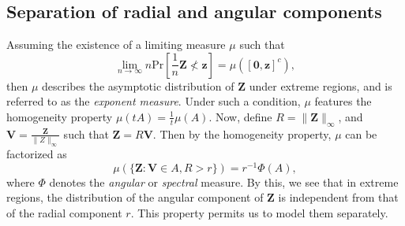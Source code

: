 \subsection{Separation of radial and angular components}
Assuming the existence of a limiting measure $\mu$ such that
\[
    \lim_{n\to\infty} n\text{Pr}\left[\frac{1}{n}\bm{Z} \not< \bm{z}\right] = \mu\left([\bm{0},\bm{z}]^c\right),
\]
then $\mu$ describes the asymptotic distribution of $\bm{Z}$ under extreme regions, and is 
    referred to as the \emph{exponent measure}.  Under such a condition, $\mu$ features 
    the homogeneity property $\mu(tA) = \frac{1}{t}\mu(A)$.  Now, define 
    $R = \lVert \bm{Z}\rVert_{\infty}$, and $\bm{V} = \frac{\bm{Z}}{\lVert Z\rVert_{\infty}}$
    such that $\bm{Z} = R\bm{V}$.  Then by the homogeneity property, $\mu$ can be factorized as
    \[
        \mu\left(\{\bm{Z} : \bm{V} \in A, R > r\}\right) = r^{-1}\Phi(A),    
    \]
    where $\Phi$ denotes the \emph{angular} or \emph{spectral} measure.  By this, we see 
    that in extreme regions, the distribution of the angular component of $\bm{Z}$ is 
    independent from that of the radial component $r$. This property permits us to model 
    them separately.

